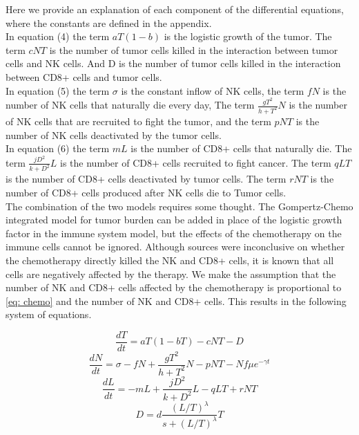 \documentclass[11pt]{amsart}
\begin{document}
	Here we provide an explanation of each component of the differential equations, where the constants are defined in the appendix. \\
In equation (4) the term $aT(1-b)$ is the logistic growth of the tumor. The term $cNT$ is the number of tumor cells killed in the interaction between tumor cells and NK cells. And D is the number of tumor cells killed in the interaction between CD8+ cells and tumor cells. \\
In equation (5) the term $\sigma$ is the constant inflow of NK cells, the term $fN$ is the number of NK cells that naturally die every day, The term $\frac{gT^2}{h + T^2}N$ is the number of NK cells that are recruited to fight the tumor, and the term $pNT$ is the number of NK cells deactivated by the tumor cells.\\
In equation (6) the term $mL$ is the number of CD8+ cells that naturally die. The term $\frac{jD^2}{k + D^2}L$ is the number of CD8+ cells recruited to fight cancer. The term $qLT$ is the number of CD8+ cells deactivated by tumor cells. The term $rNT$ is the number of CD8+ cells produced after NK cells die to Tumor cells.\\


The combination of the two models requires some thought. The Gompertz-Chemo integrated model for tumor burden can be added in place of the logistic growth factor in the immune system model, but the effects of the chemotherapy on the immune cells cannot be ignored. Although sources were inconclusive on whether the chemotherapy directly killed the NK and CD8+ cells, it is known that all cells are negatively affected by the therapy. We make the assumption that the number of NK and CD8+ cells affected by the chemotherapy is proportional to \eqref{eq: chemo} and the number of NK and CD8+ cells. This results in the following system of equations.

\begin{equation} \label{eq1}
\frac{dT}{dt} = aT(1-bT) - cNT - D 
\end{equation}
\begin{equation} \label{eq2}
\frac{dN}{dt} = \sigma - fN +\frac{gT^2}{h + T^2}N - pNT - Nf \mu e^{-\gamma t}
\end{equation}
\begin{equation} \label{eq3}
\frac{dL}{dt} = - mL +\frac{jD^2}{k + D^2}L - qLT + rNT
\end{equation}
\begin{equation} \label{eq4}
D = d\frac{(L/T)^\lambda}{s + (L/T)^\lambda}T
\end{equation}
\end{document}
